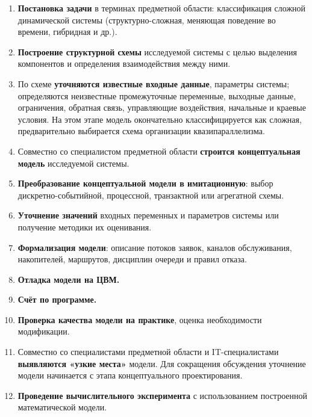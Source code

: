 \begin{enumerate}
  \item \textbf{Постановка задачи} в терминах предметной области: классификация сложной динамической системы (структурно-сложная, меняющая поведение во времени, гибридная и др.).

  \item \textbf{Построение структурной схемы} исследуемой системы с целью выделения компонентов и определения взаимодействия между ними.

  \item По схеме \textbf{уточняются известные входные данные}, параметры системы; определяются неизвестные промежуточные переменные, выходные данные, ограничения, обратная связь, управляющие воздействия, начальные и краевые условия. На этом этапе модель окончательно классифицируется как сложная, предварительно выбирается схема организации квазипараллелизма.

  \item Совместно со специалистом предметной области \textbf{строится концептуальная модель} исследуемой системы.

  \item \textbf{Преобразование концептуальной модели в имитационную}: выбор дискретно-событийной, процессной, транзактной или агрегатной схемы.

  \item \textbf{Уточнение значений} входных переменных и параметров системы или получение методики их оценивания.

  \item \textbf{Формализация модели}: описание потоков заявок, каналов обслуживания, накопителей, маршрутов, дисциплин очереди и правил отказа.

  \item \textbf{Отладка модели на ЦВМ.}

  \item \textbf{Счёт по программе.}

  \item \textbf{Проверка качества модели на практике}, оценка необходимости модификации.

  \item Совместно со специалистами предметной области и IT-специалистами \textbf{выявляются «узкие места»} модели. Для сокращения обсуждения уточнение модели начинается с этапа концептуального проектирования.

  \item \textbf{Проведение вычислительного эксперимента} с использованием построенной математической модели.
\end{enumerate}

